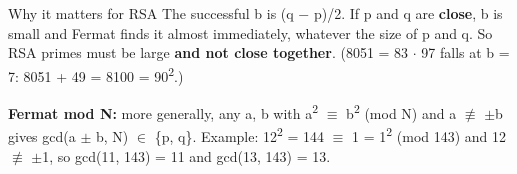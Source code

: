 \documentclass[11pt,a4paper]{article}
\begin{document}
\begin{tip}{Why it matters for RSA}
The successful b is (q \ensuremath{-} p)/2. If p and q are \textbf{close}, b is small and Fermat finds it almost immediately, whatever the size of p and q. So RSA primes must be large \textbf{and not close together}. (8051 = 83 \ensuremath{\cdot} 97 falls at b = 7: 8051 + 49 = 8100 = 90\textsuperscript{2}.)\par
\end{tip}
\textbf{Fermat mod N:} more generally, any a, b with a\textsuperscript{2} \ensuremath{\equiv} b\textsuperscript{2} (mod N) and a \ensuremath{\not\equiv} \ensuremath{\pm}b gives gcd(a \ensuremath{\pm} b, N) \ensuremath{\in} \{p, q\}. Example: 12\textsuperscript{2} = 144 \ensuremath{\equiv} 1 = 1\textsuperscript{2} (mod 143) and 12 \ensuremath{\not\equiv} \ensuremath{\pm}1, so gcd(11, 143) = 11 and gcd(13, 143) = 13.\par
\end{document}
